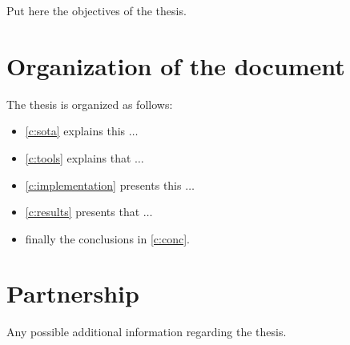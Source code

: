 %
%
Put here the objectives of the thesis.

\section{Organization of the document}

The thesis is organized as follows:

%
%
\begin{itemize}
\item \cref{c:sota} explains this $\ldots$
\item \cref{c:tools} explains that $\ldots$
\item \cref{c:implementation} presents this $\ldots$
\item \cref{c:results} presents that $\ldots$
\item finally the conclusions in \cref{c:conc}.
\end{itemize}

\section{Partnership}

Any possible additional information regarding the thesis.
